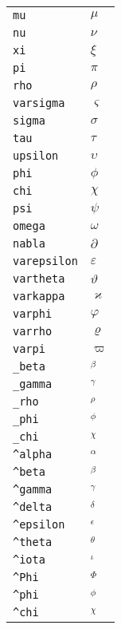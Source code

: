 \begin{longtable}{ll}
\texttt{mu}&${}\mu {}$\\
\texttt{nu}&${}\nu {}$\\
\texttt{xi}&${}\xi {}$\\
\texttt{pi}&${}\pi {}$\\
\texttt{rho}&${}\rho {}$\\
\texttt{varsigma}&${}\varsigma {}$\\
\texttt{sigma}&${}\sigma {}$\\
\texttt{tau}&${}\tau {}$\\
\texttt{upsilon}&${}\upsilon {}$\\
\texttt{phi}&${}\phi {}$\\
\texttt{chi}&${}\chi {}$\\
\texttt{psi}&${}\psi {}$\\
\texttt{omega}&${}\omega {}$\\
\texttt{nabla}&${}\partial {}$\\
\texttt{varepsilon}&${}\varepsilon {}$\\
\texttt{vartheta}&${}\vartheta {}$\\
\texttt{varkappa}&${}\varkappa {}$\\
\texttt{varphi}&${}\varphi {}$\\
\texttt{varrho}&${}\varrho {}$\\
\texttt{varpi}&${}\varpi {}$\\
\texttt{\_beta}&${}_\beta {}$\\
\texttt{\_gamma}&${}_\gamma {}$\\
\texttt{\_rho}&${}_\rho {}$\\
\texttt{\_phi}&${}_\phi {}$\\
\texttt{\_chi}&${}_\chi {}$\\
\texttt{\textasciicircum alpha}&${}^\alpha {}$\\
\texttt{\textasciicircum beta}&${}^\beta {}$\\
\texttt{\textasciicircum gamma}&${}^\gamma {}$\\
\texttt{\textasciicircum delta}&${}^\delta {}$\\
\texttt{\textasciicircum epsilon}&${}^\epsilon {}$\\
\texttt{\textasciicircum theta}&${}^\theta {}$\\
\texttt{\textasciicircum iota}&${}^\iota {}$\\
\texttt{\textasciicircum Phi}&${}^\Phi {}$\\
\texttt{\textasciicircum phi}&${}^\phi {}$\\
\texttt{\textasciicircum chi}&${}^\chi {}$\\

\end{longtable}

